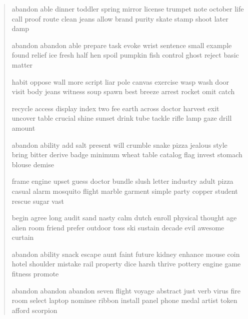 \documentclass[a5paper, twoside]{book}
\begin{document}
\begin{verse}
 abandon able dinner toddler spring mirror license trumpet note october life call proof route clean jeans allow brand purity skate stamp shoot later damp

 abandon abandon able prepare task evoke wrist sentence small example found relief ice fresh half hen spoil pumpkin fish control ghost reject basic matter

 habit oppose wall more script liar pole canvas exercise wasp wash door visit body jeans witness soup spawn best breeze arrest rocket omit catch

 recycle access display index two fee earth across doctor harvest exit uncover table crucial shine sunset drink tube tackle rifle lamp gaze drill amount

 abandon ability add salt present will crumble snake pizza jealous style bring bitter derive badge minimum wheat table catalog flag invest stomach blouse demise

 frame engine upset guess doctor bundle slush letter industry adult pizza casual alarm mosquito flight marble garment simple party copper student rescue sugar vast

 begin agree long audit sand nasty calm dutch enroll physical thought age alien room friend prefer outdoor toss ski sustain decade evil awesome curtain

 abandon ability snack escape aunt faint future kidney enhance mouse coin hotel shoulder mistake rail property dice harsh thrive pottery engine game fitness promote

 abandon abandon abandon seven flight voyage abstract just verb virus fire room select laptop nominee ribbon install panel phone medal artist token afford scorpion

\end{verse}
\end{document}
